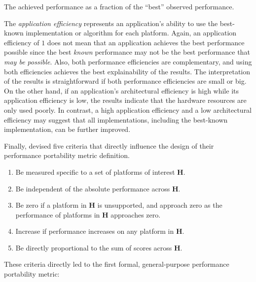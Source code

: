 \begin{definition}\label{def:app_eff}
    The achieved performance as a fraction of the \enquote{best} observed performance. 
\end{definition}
The \textit{application efficiency} represents an application's ability to use the best-known implementation or algorithm for each platform. 
Again, an application efficiency of $1$ does not mean that an application achieves the best performance possible since the best \textit{known} performance may not be the best performance that \textit{may be possible}.
Also, both performance efficiencies are complementary, and using both efficiencies achieves the best explainability of the results. 
The interpretation of the results is straightforward if both performance efficiencies are small or big.
On the other hand, if an application's architectural efficiency is high while its application efficiency is low, the results indicate that the hardware resources are only used poorly. 
In contrast, a high application efficiency and a low architectural efficiency may suggest that all implementations, including the best-known implementation, can be further improved. 

Finally, \citeauthor{pennycook_implications_2019} devised five criteria that directly influence the design of their performance portability metric definition.
\begin{definition}\label{def:pp_criteria}
    \begin{enumerate}
        \item Be measured specific to a set of platforms of interest $\mathbf{H}$.
        \item Be independent of the absolute performance across $\mathbf{H}$.
        \item Be zero if a platform in $\mathbf{H}$ is unsupported, and approach zero as the performance of platforms in $\mathbf{H}$ approaches zero. 
        \item Increase if performance increases on any platform in $\mathbf{H}$.
        \item Be directly proportional to the sum of scores across $\mathbf{H}$.
    \end{enumerate}
\end{definition}
These criteria directly led to the first formal, general-purpose performance portability metric:

